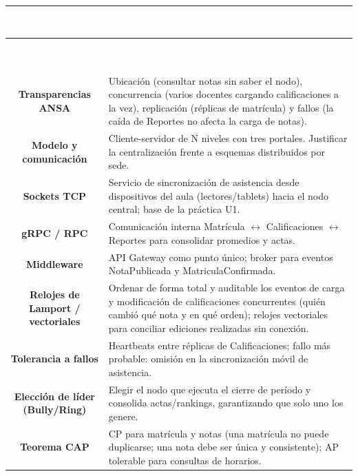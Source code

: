 \documentclass[11pt]{article}
\begin{document}
\begin{longtable}{C A}
\textcolor{white}{\textbf{Concepto (Unidad $\cdot$ Tema)}} & \textcolor{white}{\textbf{Alternativa de aplicación en este PFC}}\\
\endfirsthead
{}\textcolor{white}{\textbf{Concepto (Unidad $\cdot$ Tema)}} & \textcolor{white}{\textbf{Alternativa de aplicación en este PFC}}\\
\endhead
{}\\
\textbf{Transparencias ANSA} & Ubicación (consultar notas sin saber el nodo), concurrencia (varios docentes cargando calificaciones a la vez), replicación (réplicas de matrícula) y fallos (la caída de Reportes no afecta la carga de notas).\\
\textbf{Modelo y comunicación} & Cliente-servidor de N niveles con tres portales. Justificar la centralización frente a esquemas distribuidos por sede.\\
\textbf{Sockets TCP} & Servicio de sincronización de asistencia desde dispositivos del aula (lectores/tablets) hacia el nodo central; base de la práctica U1.\\
\textbf{gRPC / RPC} & Comunicación interna Matrícula $\leftrightarrow$ Calificaciones $\leftrightarrow$ Reportes para consolidar promedios y actas.\\
\textbf{Middleware} & API Gateway como punto único; broker para eventos NotaPublicada y MatriculaConfirmada.\\
\textbf{Relojes de Lamport / vectoriales} & Ordenar de forma total y auditable los eventos de carga y modificación de calificaciones concurrentes (quién cambió qué nota y en qué orden); relojes vectoriales para conciliar ediciones realizadas sin conexión.\\
\textbf{Tolerancia a fallos} & Heartbeats entre réplicas de Calificaciones; fallo más probable: omisión en la sincronización móvil de asistencia.\\
\textbf{Elección de líder (Bully/Ring)} & Elegir el nodo que ejecuta el cierre de período y consolida actas/rankings, garantizando que solo uno los genere.\\
\textbf{Teorema CAP} & CP para matrícula y notas (una matrícula no puede duplicarse; una nota debe ser única y consistente); AP tolerable para consultas de horarios.\\

\end{longtable}
\end{document}
